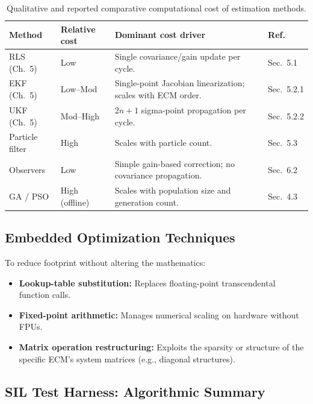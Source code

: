 \begin{table}[htbp]
	\centering
	\caption{Qualitative and reported comparative computational cost of estimation methods.}
	\label{tab:computational_cost}
	\renewcommand{\arraystretch}{1.3}
	\begin{tabularx}{\textwidth}{@{}l l X l@{}}
		\toprule
		\textbf{Method} & \textbf{Relative cost} & \textbf{Dominant cost driver} & \textbf{Ref.} \\
		\midrule
		RLS (Ch.~5) & Low & Single covariance/gain update per cycle. & Sec.~5.1 \\
		EKF (Ch.~5) & Low--Mod & Single-point Jacobian linearization; scales with ECM order. & Sec.~5.2.1 \\
		UKF (Ch.~5) & Mod--High & $2n+1$ sigma-point propagation per cycle. & Sec.~5.2.2 \\
		Particle filter & High & Scales with particle count. & Sec.~5.3 \\
		Observers & Low & Simple gain-based correction; no covariance propagation. & Sec.~6.2 \\
		GA / PSO & High (offline) & Scales with population size and generation count. & Sec.~4.3 \\
		\bottomrule
	\end{tabularx}
\end{table}

\subsection{Embedded Optimization Techniques}
\label{ssec:embedded_optimization}
To reduce footprint without altering the mathematics:
\begin{itemize}
	\item \textbf{Lookup-table substitution:} Replaces floating-point transcendental function calls.
	\item \textbf{Fixed-point arithmetic:} Manages numerical scaling on hardware without FPUs.
	\item \textbf{Matrix operation restructuring:} Exploits the sparsity or structure of the specific ECM's system matrices (e.g., diagonal structures).
\end{itemize}

\subsection{SIL Test Harness: Algorithmic Summary}
\label{ssec:sil_harness_pseudocode}

